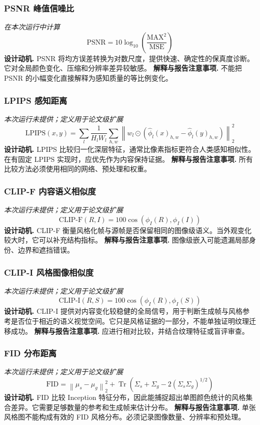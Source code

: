 \documentclass[UTF8,10pt]{ctexart}
\begin{document}
\subsubsection*{PSNR 峰值信噪比}
\textit{在本次运行中计算}
\begin{equation*}
\mathrm{PSNR}=10\log_{10}\!\left(\frac{\mathrm{MAX}^2}{\mathrm{MSE}}\right)
\end{equation*}
\textbf{设计动机.} PSNR 将均方误差转换为对数尺度，提供快速、确定性的保真度诊断。它对全局颜色变化、压缩和分辨率差异较敏感。
\textbf{解释与报告注意事项.} 不能把 PSNR 的小幅变化直接解释为感知质量的等比例变化。
\subsubsection*{LPIPS 感知距离}
\textit{本次运行未提供；定义用于论文级扩展}
\begin{equation*}
\mathrm{LPIPS}(x,y)=\sum_l\frac{1}{H_lW_l}\sum_{h,w}\left\|w_l\odot(\hat\phi_l(x)_{h,w}-\hat\phi_l(y)_{h,w})\right\|_2^2
\end{equation*}
\textbf{设计动机.} LPIPS 比较归一化深层特征，通常比像素指标更符合人类感知相似性。在有固定 LPIPS 实现时，应优先作为内容保持证据。
\textbf{解释与报告注意事项.} 所有比较方法必须使用相同的网络、预处理和权重。
\subsubsection*{CLIP-F 内容语义相似度}
\textit{本次运行未提供；定义用于论文级扩展}
\begin{equation*}
\mathrm{CLIP\text{-}F}(R,I)=100\cos\!\left(\phi_I(R),\phi_I(I)\right)
\end{equation*}
\textbf{设计动机.} CLIP-F 衡量风格化帧与源帧是否保留相同的图像级语义。当外观变化较大时，它可以补充结构指标。
\textbf{解释与报告注意事项.} 图像级嵌入可能遗漏局部身份、边界和遮挡错误。
\subsubsection*{CLIP-I 风格图像相似度}
\textit{本次运行未提供；定义用于论文级扩展}
\begin{equation*}
\mathrm{CLIP\text{-}I}(R,S)=100\cos\!\left(\phi_I(R),\phi_I(S)\right)
\end{equation*}
\textbf{设计动机.} CLIP-I 提供对内容变化较稳健的全局信号，用于判断生成帧与风格参考是否位于相近的语义视觉空间。它只是风格证据的一部分，不能单独证明纹理迁移成功。
\textbf{解释与报告注意事项.} 应进行相对比较，并结合纹理特征或盲评审查。
\subsubsection*{FID 分布距离}
\textit{本次运行未提供；定义用于论文级扩展}
\begin{equation*}
\mathrm{FID}=\left\|\mu_s-\mu_g\right\|_2^2+\operatorname{Tr}\!\left(\Sigma_s+\Sigma_g-2(\Sigma_s\Sigma_g)^{1/2}\right)
\end{equation*}
\textbf{设计动机.} FID 比较 Inception 特征分布，因此能捕捉超出单图颜色统计的风格集合差异。它需要足够数量的参考和生成帧来估计分布。
\textbf{解释与报告注意事项.} 单张风格图不能构成有效的 FID 风格分布。必须记录图像数量、分辨率和预处理。
\end{document}
